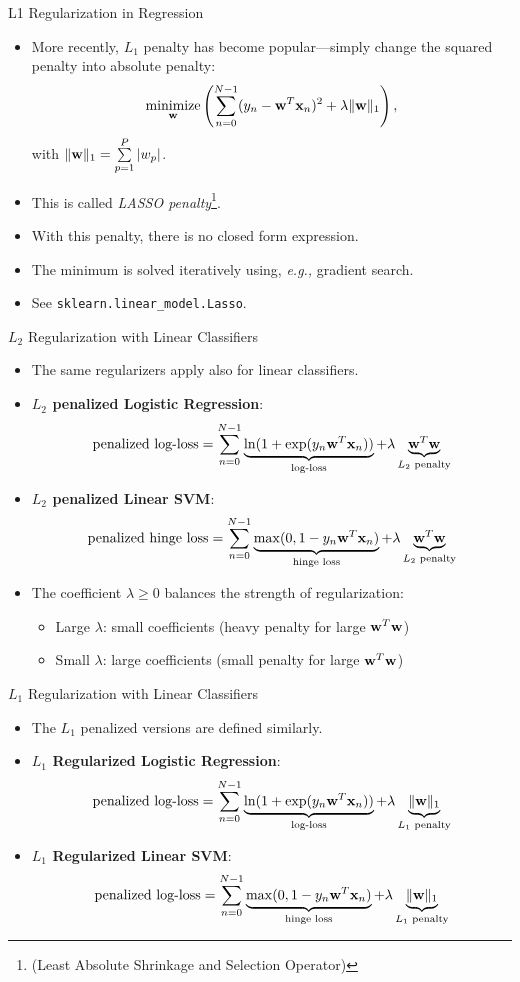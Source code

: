 \documentclass[10pt, aspectratio=169]{beamer} %
\DeclareMathOperator*{\minimize}{minimize} %
\newcommand{\w}{{\bf w}}
\newcommand{\x}{{\bf x}}
\begin{document}
\begin{frame}[fragile]{L1 Regularization in Regression}
\begin{itemize}
\item More recently, $L_1$ penalty has become popular---simply change the squared penalty into absolute penalty:
\[
\minimize_{\w}\left( \sum_{n = 0}^{N-1} (y_n - \w^T\x_n)^2 + \lambda\| \w\|_1 \right),
\]
with $\| \w \|_1 = \sum\limits_{p=1}^P |w_p|$.
\item This is called \emph{LASSO penalty}\footnote{(Least Absolute Shrinkage and Selection Operator)}.
\item With this penalty, there is no closed form expression. 
\item The minimum is solved iteratively using, \emph{e.g.,} gradient search.
\item See \verb+sklearn.linear_model.Lasso+.
\end{itemize}
\end{frame}

\begin{frame}{$L_2$ Regularization with Linear Classifiers}
\begin{itemize}
\item The same regularizers apply also for linear classifiers.
\item \textbf{$L_2$ penalized Logistic Regression}:
\[
\text{penalized log-loss} = \sum_{n = 0}^{N-1}\underbrace{ \ln(1 + \exp(y_n\w^T\x_n))}_{\text {log-loss}} + \lambda \underbrace{\w^T\w}_{L_2 \text{ penalty}}
\]
\item \textbf{$L_2$ penalized Linear SVM}:
\[
\text{penalized hinge loss} = \sum_{n = 0}^{N-1}\underbrace{ \max(0, 1-y_n\w^T\x_n)}_{\text {hinge loss}} + \lambda \underbrace{\w^T\w}_{L_2 \text{ penalty}}
\]
\item The coefficient $\lambda\ge 0$ balances the strength of regularization:
\begin{itemize}
	\item Large $\lambda$: small coefficients (heavy penalty for large $\w^T\w$)
	\item Small $\lambda$: large coefficients (small penalty for large $\w^T\w$)
\end{itemize}
\end{itemize}
\end{frame}

\begin{frame}{$L_1$ Regularization with Linear Classifiers}
\begin{itemize}
	\item The $L_1$ penalized versions are defined similarly.
\item \textbf{$L_1$ Regularized Logistic Regression}:
\[
\text{penalized log-loss} = \sum_{n = 0}^{N-1}\underbrace{ \ln(1 + \exp(y_n\w^T\x_n))}_{\text {log-loss}} + \lambda \underbrace{\|\w\|_1}_{L_1 \text{ penalty}}
\]
\item \textbf{$L_1$ Regularized Linear SVM}:
\[
\text{penalized log-loss} = \sum_{n = 0}^{N-1}\underbrace{ \max(0, 1-y_n\w^T\x_n)}_{\text {hinge loss}} + \lambda \underbrace{\|\w\|_1}_{L_1 \text{ penalty}}
\]
\end{itemize}
\end{frame}
\end{document}
